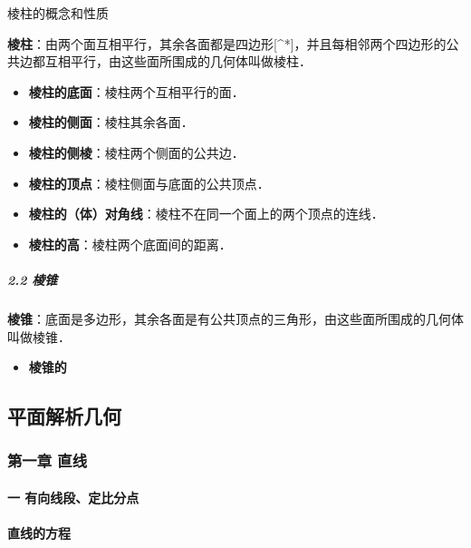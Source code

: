 \documentclass[
]{article}
\begin{document}
棱柱的概念和性质

\textbf{棱柱}：由两个面互相平行，其余各面都是四边形{[}\^{}*{]}，并且每相邻两个四边形的公共边都互相平行，由这些面所围成的几何体叫做棱柱．\\

\begin{itemize}
\item
  \textbf{棱柱的底面}：棱柱两个互相平行的面．
\item
  \textbf{棱柱的侧面}：棱柱其余各面．
\item
  \textbf{棱柱的侧棱}：棱柱两个侧面的公共边．
\item
  \textbf{棱柱的顶点}：棱柱侧面与底面的公共顶点．
\item
  \textbf{棱柱的（体）对角线}：棱柱不在同一个面上的两个顶点的连线．
\item
  \textbf{棱柱的高}：棱柱两个底面间的距离．
\end{itemize}

\hypertarget{22-ux68f1ux9525}{%
\subparagraph{2.2 棱锥}\label{22-ux68f1ux9525}}

\textbf{棱锥}：底面是多边形，其余各面是有公共顶点的三角形，由这些面所围成的几何体叫做棱锥．

\begin{itemize}
\item
  \textbf{棱锥的}
\end{itemize}

\hypertarget{ux5e73ux9762ux89e3ux6790ux51e0ux4f55}{%
\subsection{平面解析几何}\label{ux5e73ux9762ux89e3ux6790ux51e0ux4f55}}

\hypertarget{ux7b2cux4e00ux7ae0-ux76f4ux7ebf}{%
\subsubsection{第一章 直线}\label{ux7b2cux4e00ux7ae0-ux76f4ux7ebf}}

\hypertarget{ux4e00-ux6709ux5411ux7ebfux6bb5ux5b9aux6bd4ux5206ux70b9}{%
\paragraph{一
有向线段、定比分点}\label{ux4e00-ux6709ux5411ux7ebfux6bb5ux5b9aux6bd4ux5206ux70b9}}

\hypertarget{ux76f4ux7ebfux7684ux65b9ux7a0b}{%
\paragraph{直线的方程}\label{ux76f4ux7ebfux7684ux65b9ux7a0b}}
\end{document}
